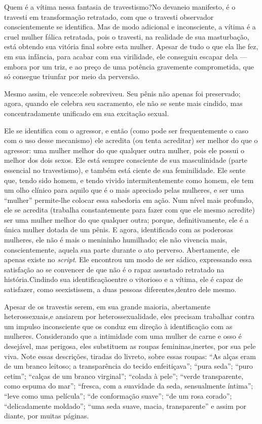 Quem é a vítima nessa fantasia de travestismo?\idxfetictrav[|(] No devaneio
manifesto, é o travesti em transformação retratado, com que o
travesti observador conscientemente se identifica. Mas de modo
adicional e inconsciente, a vítima é a cruel mulher fálica\idxcastamulh{} retratada,
pois o travesti, na realidade de sua masturbação,\idxmasturt{} está obtendo sua
vitória final sobre esta mulher. Apesar de tudo o que ela lhe fez, em sua
infância, para acabar com sua virilidade, ele conseguiu escapar dela
--- embora por um triz, e ao preço de uma potência gravemente
comprometida, que só consegue triunfar por meio da perversão.

Mesmo assim, ele vence:\idxtravemcliv[|(] ele sobreviveu. Seu pênis não apenas foi
preservado; agora, quando ele celebra seu sacramento, ele não se
sente mais cindido, mas concentradamente unificado em sua excitação
sexual.

Ele se identifica com o agressor, e então (como pode ser
frequentemente o caso com o uso desse mecanismo) ele acredita (ou tenta
acreditar) ser melhor do que o agressor: uma mulher melhor do que
qualquer outra mulher, pois ele possui o melhor dos dois sexos. Ele
está sempre consciente de sua masculinidade\idxmascutra{} (parte essencial no
travestismo), e também está ciente de sua feminilidade. Ele sente que,
tendo sido homem, e tendo vivido intermitentemente como homem, ele tem
um olho clínico para aquilo que é o mais apreciado pelas mulheres, e
ser uma ``mulher'' permite-lhe colocar essa
sabedoria em ação. Num nível mais profundo, ele se acredita (trabalha
constantemente para fazer com que ele mesmo acredite) ser uma mulher
melhor do que qualquer outra; porque, definitivamente, ele é a única
mulher dotada de um pênis. E agora, identificado com as poderosas
mulheres, ele não é mais o menininho humilhado; ele não vivencia mais,
conscientemente, aquela sua parte durante o ato perverso. Abertamente,
ele apenas existe no \textit{script}. Ele encontrou um modo de ser
sádico, expressando essa satisfação ao se convencer de que não é o
rapaz assustado retratado na história.\idxtravemmasc[|)] Cindindo sua identificação\idxtravemfant[|)]
entre o vitorioso e a vítima, ele é capaz de satisfazer, como se\idxpornoviti[|)]
existissem, a duas pessoas diferentes,\idxtraumatrae[|)] dentro dele mesmo.\idxpornofant[|)]

Apesar de os travestis serem, em sua grande maioria, abertamente\idxtravemhete{}
heterossexuais,\idxheterotrav[|(] e ansiarem por heterossexualidade, eles precisam
trabalhar contra um impulso inconsciente que os conduz em direção à
identificação com as mulheres. Considerando que a intimidade com uma
mulher de carne e osso é desejável, mas perigosa, eles substituem as
roupas femininas,\idxtravemsimb[|(] inertes, por sua pele viva. Note essas descrições,
tiradas do livreto, sobre essas roupas: ``As alças eram de
um branco leitoso; a transparência do tecido
enfeitiçava''; ``pura seda'';
``puro cetim''; ``calças de um
branco virginal''; ``colada à
pele''; ``verde transparente, como espuma do
mar''; ``fresca, com a suavidade da seda,
sensualmente íntima''; ``leve como uma
película''; ``de conformação
suave''; ``de um rosa corado'';
``delicadamente moldado''; ``uma
seda suave, macia, transparente'' e assim por diante, por
muitas páginas.

